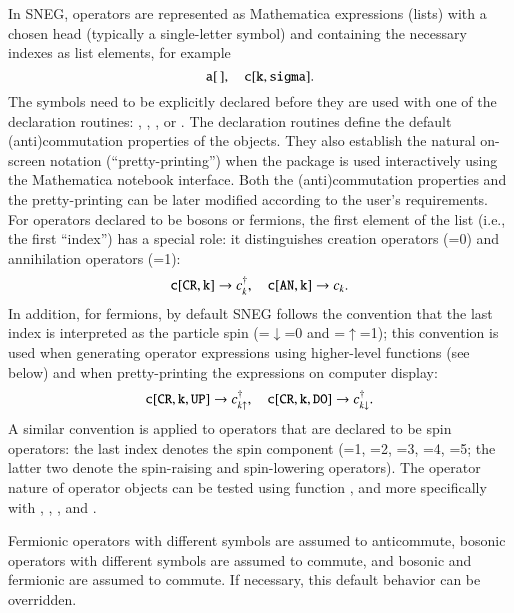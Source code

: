 \documentclass[3p,number,preprint]{elsarticle}
\begin{document}
In SNEG, operators are represented as Mathematica expressions (lists)
with a chosen head (typically a single-letter symbol) and containing
the necessary indexes as list elements, for example
%
\begin{equation}
{\tt a[\,]},\quad
{\tt c[k,sigma]}.
\end{equation}
%
The symbols need to be explicitly declared before they are used with 
one of the declaration routines: ,
, , or
. The declaration routines define the default
(anti)commutation properties of the objects. They also establish the
natural on-screen notation (``pretty-printing'') when the package is
used interactively using the Mathematica notebook interface. Both the
(anti)commutation properties and the pretty-printing can be later
modified according to the user's requirements. For operators declared
to be bosons or fermions, the first element of the list (i.e., the
first ``index'') has a special role: it distinguishes creation
operators (=0) and annihilation operators (=1):
%
\begin{equation}
{\tt c[CR,k]} \to c^\dag_{k}, \quad
{\tt c[AN,k]} \to c_{k}.
\end{equation}
%
In addition, for fermions, by default SNEG follows the convention that
the last index is interpreted as the particle spin
(=$\downarrow$=0 and =$\uparrow$=1); this convention
is used when generating operator expressions using higher-level
functions (see below) and when pretty-printing the expressions on 
computer display:
%
\begin{equation}
{\tt c[CR,k,UP]} \to c^\dag_{k\uparrow}, \quad
{\tt c[CR,k,DO]} \to c^\dag_{k\downarrow}.
\end{equation}
%
A similar convention is applied to operators that are declared to be
spin operators: the last index denotes the spin component (=1,
=2, =3, =4, =5; the latter two denote the
spin-raising and spin-lowering operators). The operator nature of
operator objects can be tested using function , and
more specifically with , , ,
and .

Fermionic operators with different symbols are assumed to anticommute,
bosonic operators with different symbols are assumed to commute, and
bosonic and fermionic are assumed to commute. If necessary, this
default behavior can be overridden.
\end{document}
